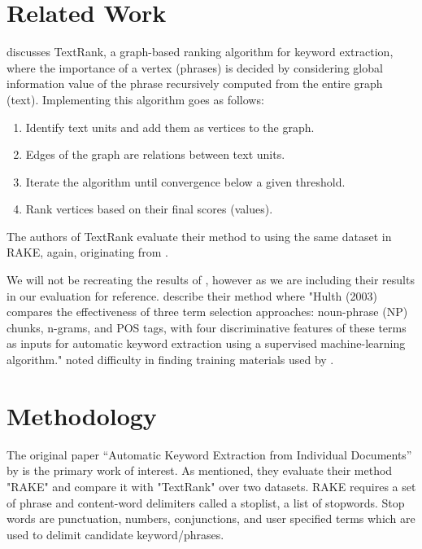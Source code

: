 \documentclass[11pt,a4paper]{article}
\begin{document}
\section{Related Work}

\citet{4} discusses TextRank, a graph-based ranking algorithm for keyword extraction, where the importance of a vertex (phrases) is decided by considering global information value of the phrase recursively computed from the entire graph (text). Implementing this algorithm goes as follows:

\begin{enumerate}
\item Identify text units and add them as vertices to the graph.
\item Edges of the graph are relations between text units.
\item Iterate the algorithm until convergence below a given threshold. 
\item Rank vertices based on their final scores (values).
\end{enumerate}   

The authors of TextRank evaluate their method to \citet{hulth-2003-improved} using the same dataset in RAKE, again, originating from \citet{hulth-2003-improved}.

We will not be recreating the results of \citet{hulth-2003-improved}, however as we are including their results in our evaluation for reference. \citet{1} describe their method where "Hulth (2003) compares the effectiveness of three term selection approaches: noun-phrase (NP) chunks, n-grams, and POS tags, with four discriminative features of these terms as inputs for automatic keyword extraction using a supervised machine-learning algorithm." \citet{1} noted difficulty in finding training materials used by \citet{hulth-2003-improved}.    

\section{Methodology}

The original paper “Automatic Keyword Extraction from Individual Documents” by \citet{1} is the primary work of interest. As mentioned, they evaluate their method "RAKE" and compare it with "TextRank" over two datasets. RAKE requires a set of phrase and content-word delimiters called a stoplist, a list of stopwords. Stop words are punctuation, numbers, conjunctions, and user specified terms which are used to delimit candidate keyword/phrases. 
\end{document}
